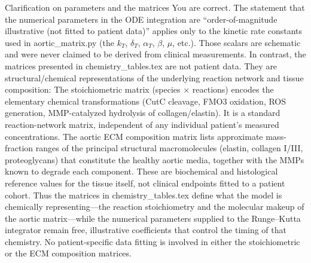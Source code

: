 Clarification on parameters and the matrices
You are correct. The statement that the numerical parameters in the ODE integration are “order-of-magnitude illustrative (not fitted to patient data)” applies only to the kinetic rate constants used in aortic_matrix.py (the \(k_T\), \(\delta_T\), \(\alpha_T\), \(\beta\), \(\mu\), etc.). Those scalars are schematic and were never claimed to be derived from clinical measurements.
In contrast, the matrices presented in chemistry_tables.tex are not patient data. They are structural/chemical representations of the underlying reaction network and tissue composition:
The stoichiometric matrix (species × reactions) encodes the elementary chemical transformations (CutC cleavage, FMO3 oxidation, ROS generation, MMP-catalyzed hydrolysis of collagen/elastin). It is a standard reaction-network matrix, independent of any individual patient’s measured concentrations.
The aortic ECM composition matrix lists approximate mass-fraction ranges of the principal structural macromolecules (elastin, collagen I/III, proteoglycans) that constitute the healthy aortic media, together with the MMPs known to degrade each component. These are biochemical and histological reference values for the tissue itself, not clinical endpoints fitted to a patient cohort.
Thus the matrices in chemistry_tables.tex define what the model is chemically representing—the reaction stoichiometry and the molecular makeup of the aortic matrix—while the numerical parameters supplied to the Runge–Kutta integrator remain free, illustrative coefficients that control the timing of that chemistry. No patient-specific data fitting is involved in either the stoichiometric or the ECM composition matrices.
